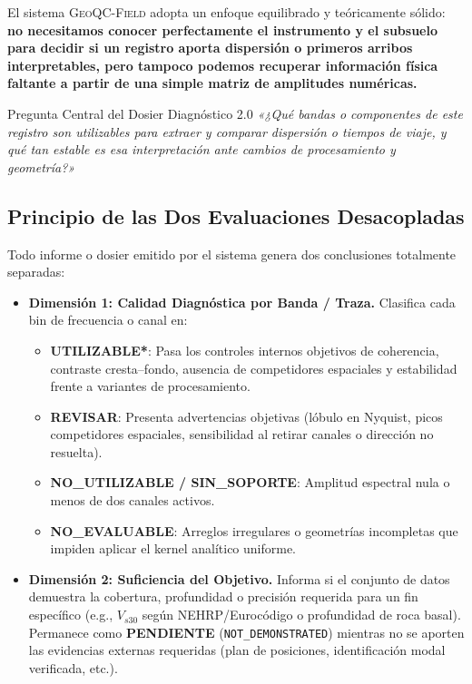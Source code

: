 \documentclass[11pt,a4paper]{article}
\begin{document}
El sistema \textsc{GeoQC-Field} adopta un enfoque equilibrado y teóricamente sólido: \textbf{no necesitamos conocer perfectamente el instrumento y el subsuelo para decidir si un registro aporta dispersión o primeros arribos interpretables, pero tampoco podemos recuperar información física faltante a partir de una simple matriz de amplitudes numéricas.}

\begin{principiobox}{Pregunta Central del Dosier Diagnóstico 2.0}
\centering
\emph{«¿Qué bandas o componentes de este registro son utilizables para extraer y comparar dispersión o tiempos de viaje, y qué tan estable es esa interpretación ante cambios de procesamiento y geometría?»}
\end{principiobox}

\subsection{Principio de las Dos Evaluaciones Desacopladas}
Todo informe o dosier emitido por el sistema genera dos conclusiones totalmente separadas:
\begin{itemize}
    \item \textbf{Dimensión 1: Calidad Diagnóstica por Banda / Traza.} Clasifica cada bin de frecuencia o canal en:
    \begin{itemize}
        \item \textcolor{usablegreen}{\textbf{UTILIZABLE*}}: Pasa los controles internos objetivos de coherencia, contraste cresta--fondo, ausencia de competidores espaciales y estabilidad frente a variantes de procesamiento.
        \item \textcolor{reviewamber}{\textbf{REVISAR}}: Presenta advertencias objetivas (lóbulo en Nyquist, picos competidores espaciales, sensibilidad al retirar canales o dirección no resuelta).
        \item \textcolor{badred}{\textbf{NO\_UTILIZABLE / SIN\_SOPORTE}}: Amplitud espectral nula o menos de dos canales activos.
        \item \textcolor{unusablegrey}{\textbf{NO\_EVALUABLE}}: Arreglos irregulares o geometrías incompletas que impiden aplicar el kernel analítico uniforme.
    \end{itemize}
    \item \textbf{Dimensión 2: Suficiencia del Objetivo.} Informa si el conjunto de datos demuestra la cobertura, profundidad o precisión requerida para un fin específico (e.g., $V_{s30}$ según NEHRP/Eurocódigo o profundidad de roca basal). Permanece como \textbf{PENDIENTE} (\texttt{NOT\_DEMONSTRATED}) mientras no se aporten las evidencias externas requeridas (plan de posiciones, identificación modal verificada, etc.).
\end{itemize}
\end{document}
